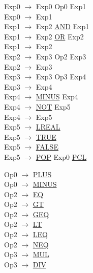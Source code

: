 \documentclass[\main/MemoriaPL.tex]{subfiles}
\begin{document}
    \begin{center}
      \begin{minipage}{.5\textwidth}
        Exp0 $\rightarrow$ Exp0 Op0 Exp1\\
        Exp0 $\rightarrow$ Exp1\\
        Exp1 $\rightarrow$ Exp2 \underline{AND} Exp1\\
        Exp1 $\rightarrow$ Exp2 \underline{OR} Exp2\\
        Exp1 $\rightarrow$ Exp2\\
        Exp2 $\rightarrow$ Exp3 Op2 Exp3\\
        Exp2 $\rightarrow$ Exp3\\
        Exp3 $\rightarrow$ Exp3 Op3 Exp4\\
        Exp3 $\rightarrow$ Exp4\\
        Exp4 $\rightarrow$ \underline{MINUS} Exp4\\
        Exp4 $\rightarrow$ \underline{NOT} Exp5\\
        Exp4 $\rightarrow$ Exp5\\
        Exp5 $\rightarrow$ \underline{LREAL}\\
        Exp5 $\rightarrow$ \underline{TRUE}\\
        Exp5 $\rightarrow$ \underline{FALSE}\\
        Exp5 $\rightarrow$ \underline{POP} Exp0 \underline{PCL}
      \end{minipage}%
      \begin{minipage}{.5\textwidth}
        Op0 $\rightarrow$ \underline{PLUS}\\
        Op0 $\rightarrow$ \underline{MINUS}\\
        Op2 $\rightarrow$ \underline{EQ}\\
        Op2 $\rightarrow$ \underline{GT}\\
        Op2 $\rightarrow$ \underline{GEQ}\\
        Op2 $\rightarrow$ \underline{LT}\\
        Op2 $\rightarrow$ \underline{LEQ}\\
        Op2 $\rightarrow$ \underline{NEQ}\\
        Op3 $\rightarrow$ \underline{MUL}\\
        Op3 $\rightarrow$ \underline{DIV}\\
      \end{minipage}
    \end{center}
\end{document}
